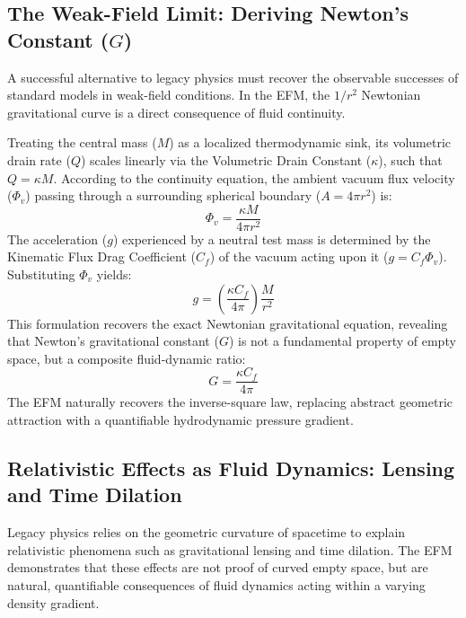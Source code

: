 \documentclass[11pt, a4paper]{article}
\begin{document}
  \subsection{The Weak-Field Limit: Deriving Newton's Constant (\texorpdfstring{$G$}{G})}
  A successful alternative to legacy physics must recover the observable successes of standard models in weak-field conditions. In the EFM, the $1/r^2$ Newtonian gravitational curve is a direct consequence of fluid continuity.
  
  Treating the central mass ($M$) as a localized thermodynamic sink, its volumetric drain rate ($Q$) scales linearly via the Volumetric Drain Constant ($\kappa$), such that $Q = \kappa M$. According to the continuity equation, the ambient vacuum flux velocity ($\Phi_v$) passing through a surrounding spherical boundary ($A = 4\pi r^2$) is:
  \begin{equation}
    \Phi_v = \frac{\kappa M}{4\pi r^2}
  \end{equation}
  The acceleration ($g$) experienced by a neutral test mass is determined by the Kinematic Flux Drag Coefficient ($C_f$) of the vacuum acting upon it ($g = C_f \Phi_v$). Substituting $\Phi_v$ yields:
  \begin{equation}
    g = \left( \frac{\kappa C_f}{4\pi} \right) \frac{M}{r^2}
  \end{equation}
  This formulation recovers the exact Newtonian gravitational equation, revealing that Newton's gravitational constant ($G$) is not a fundamental property of empty space, but a composite fluid-dynamic ratio:
  \begin{equation}
    G = \frac{\kappa C_f}{4\pi}
  \end{equation}
  The EFM naturally recovers the inverse-square law, replacing abstract geometric attraction with a quantifiable hydrodynamic pressure gradient.

  \subsection{Relativistic Effects as Fluid Dynamics: Lensing and Time Dilation}
  Legacy physics relies on the geometric curvature of spacetime to explain relativistic phenomena such as gravitational lensing and time dilation. The EFM demonstrates that these effects are not proof of curved empty space, but are natural, quantifiable consequences of fluid dynamics acting within a varying density gradient.
\end{document}

